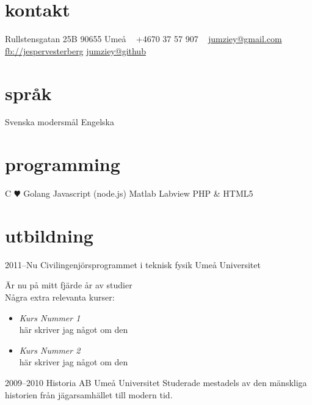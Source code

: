 \documentclass[]{friggeri-cv} %
\begin{document}


\begin{aside} %
\section{kontakt}
Rullstensgatan 25B
90655 Umeå
~
+4670 37 57 907
~
\href{mailto:jumziey@gmail.com}{jumziey@gmail.com}
\href{https://www.facebook.com/jesper.vesterberlg}{fb://jespervesterberg}
\href{https://github.com/Jumziey}{jumziey@github}
\section{språk}
Svenska modersmål
Engelska 
\section{programming}
C{\color{red} $\varheartsuit$}
Golang
Javascript (node.js)
Matlab
Labview
PHP \& HTML5
\end{aside}


\section{utbildning}

\begin{entrylist}
\entry
{2011--Nu}
{Civilingenjörsprogrammet {\normalfont i teknisk fysik}}
{Umeå Universitet}
{Är nu på mitt fjärde år av studier\\
Några extra relevanta kurser: 
\begin{itemize}
\item \emph{Kurs Nummer 1} \\
	här skriver jag något om den
\item \emph{Kurs Nummer 2} \\
	här skriver jag något om den 
\end{itemize}
}
\entry
{2009--2010}
{Historia {\normalfont AB}}
{Umeå Universitet}
{Studerade mestadels av den mänskliga historien från jägarsamhället till modern tid.}
\end{entrylist}
\end{document}
